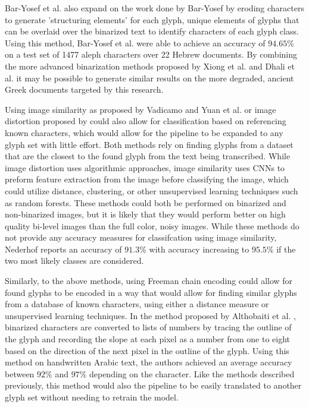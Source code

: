 \documentclass[12pt,a4paper,final]{article}
\begin{document}
Bar-Yosef et al.\cite{Bar-Yosef2007} also expand on the work done by Bar-Yosef by eroding characters to generate 'structuring elements' for each glyph, unique elements of glyphs that can be overlaid over the binarized text to identify characters of each glyph class. Using  this method, Bar-Yosef et al. were able to achieve an accuracy of $94.65\%$ on a test set of 1477 aleph characters over 22 Hebrew documents. By combining the more advanced binarization methods proposed by Xiong et al.\cite{Xiong} and Dhali et al.\cite{Dhali} it may be possible to generate similar results on the more degraded, ancient Greek documents targeted by this research.

Using image similarity as proposed by Vadicamo\cite{Vadicamo} and Yuan et al.\cite{Yuan} or image distortion proposed by could also allow for classification based on referencing known characters, which would allow for the pipeline to be expanded to any glyph set with little effort. Both methods rely on finding glyphs from a dataset that are the closest to the found glyph from the text being transcribed. While image distortion uses algorithmic approaches, image similarity uses CNNs to preform feature extraction from the image before classifying the image, which could utilize distance, clustering, or other unsupervised learning techniques such as random forests.
These methods could both be performed on binarized and non-binarized images, but it is likely that they would perform better on high quality bi-level images than the full color, noisy images. While these methods do not provide any accuracy measures for classifcation using image similarity, Nederhof \cite{Nederhof} reports an accuracy of $91.3\%$ with accuracy increasing to $95.5\%$ if the two most likely classes are considered.

Similarly, to the above methods, using Freeman chain encoding could allow for found glyphs to be encoded in a way that would allow for finding similar glyphs from a database of known characters, using either a distance measure or unsupervised learning techniques. In the method proposed by Althobaiti et al. \cite{Althobaiti}, binarized characters are converted to lists of numbers by tracing the outline of the glyph and recording the slope at each pixel as a number from one to eight based on the direction of the next pixel in the outline of the glyph. Using this method on handwritten Arabic text, the authors achieved an average accuracy between $92\%$ and $97\%$ depending on the character. Like the methods described previously, this method would also the pipeline to be easily translated to another glyph set without needing to retrain the model.
\end{document}
